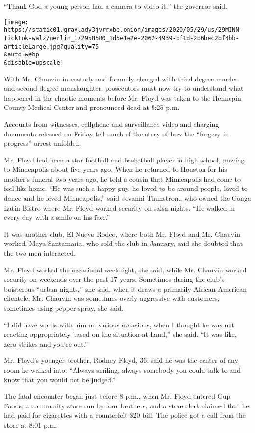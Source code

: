 ``Thank God a young person had a camera to video it,'' the governor
said.

\texttt{[image: https://static01.graylady3jvrrxbe.onion/images/2020/05/29/us/29MINN-Ticktok-walz/merlin\_172958580\_1d5e1e2e-2062-4939-bf1d-2b6bec2bf4bb-articleLarge.jpg?quality=75\\\&auto=webp\\\&disable=upscale]}

With Mr. Chauvin in custody and formally charged with third-degree
murder and second-degree manslaughter, prosecutors must now try to
understand what happened in the chaotic moments before Mr. Floyd was
taken to the Hennepin County Medical Center and pronounced dead at 9:25
p.m.

Accounts from witnesses, cellphone and surveillance video and charging
documents released on Friday tell much of the story of how the
``forgery-in-progress'' arrest unfolded.

Mr. Floyd had been a star football and basketball player in high school,
moving to Minneapolis about five years ago. When he returned to Houston
for his mother's funeral two years ago, he told a cousin that
Minneapolis had come to feel like home. ``He was such a happy guy, he
loved to be around people, loved to dance and he loved Minneapolis,''
said Jovanni Thunstrom, who owned the Conga Latin Bistro where Mr. Floyd
worked security on salsa nights. ``He walked in every day with a smile
on his face.''

It was another club, El Nuevo Rodeo, where both Mr. Floyd and Mr.
Chauvin worked. Maya Santamaria, who sold the club in January, said she
doubted that the two men interacted.

Mr. Floyd worked the occasional weeknight, she said, while Mr. Chauvin
worked security on weekends over the past 17 years. Sometimes during the
club's boisterous ``urban nights,'' she said, when it draws a primarily
African-American clientele, Mr. Chauvin was sometimes overly aggressive
with customers, sometimes using pepper spray, she said.

``I did have words with him on various occasions, when I thought he was
not reacting appropriately based on the situation at hand,'' she said.
``It was like, zero strikes and you're out.''

Mr. Floyd's younger brother, Rodney Floyd, 36, said he was the center of
any room he walked into. ``Always smiling, always somebody you could
talk to and know that you would not be judged.''

The fatal encounter began just before 8 p.m., when Mr. Floyd entered Cup
Foods, a community store run by four brothers, and a store clerk claimed
that he had paid for cigarettes with a counterfeit \$20 bill. The police
got a call from the store at 8:01 p.m.

